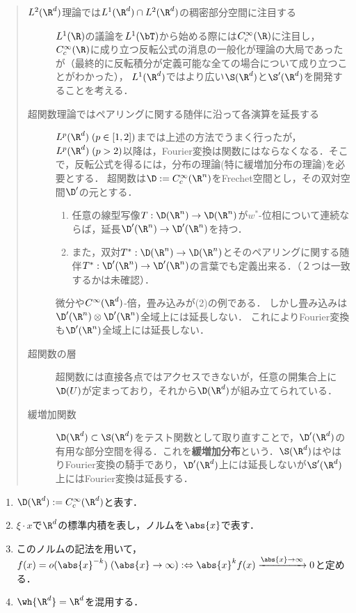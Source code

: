 \documentclass[uplatex,dvipdfmx]{jsreport}
\begin{document}
\begin{quotation}
    \begin{description}
        \item[$L^2(\R^d)$理論では$L^1(\R^d)\cap L^2(\R^d)$の稠密部分空間に注目する] $L^1(\R)$の議論を$L^1(\bT)$から始める際には$C_c^\infty(\R)$に注目し，
        $C_c^\infty(\R)$に成り立つ反転公式の消息の一般化が理論の大局であったが（最終的に反転積分が定義可能な全ての場合について成り立つことがわかった），
        $L^1(\R^d)$ではより広い$\S(\R^d)$と$\S'(\R^d)$を開発することを考える．
        \item[超関数理論ではペアリングに関する随伴に沿って各演算を延長する] 
        $L^p(\R^d)\;(p\in[1,2])$までは上述の方法でうまく行ったが，$L^p(\R^d)\;(p>2)$以降は，Fourier変換は関数にはならなくなる．そこで，反転公式を得るには，分布の理論(特に緩増加分布の理論)を必要とする．
        超関数は$\D:=C_c^\infty(\R^n)$をFrechet空間とし，その双対空間$\D'$の元とする．
        \begin{enumerate}
            \item 任意の線型写像$T:\D(\R^n)\to\D(\R^n)$が$w^*$-位相について連続ならば，延長$\D'(\R^n)\to\D'(\R^n)$を持つ．
            \item また，双対$T^*:\D(\R^n)\to\D(\R^n)$とそのペアリングに関する随伴$T^*:\D'(\R^n)\to\D'(\R^n)$の言葉でも定義出来る．（２つは一致するかは未確認）．
        \end{enumerate}
        微分や$C^\infty(\R^d)$-倍，畳み込みが(2)の例である．
        しかし畳み込みは$\D'(\R^n)\otimes\D'(\R^n)$全域上には延長しない．
        これによりFourier変換も$\D'(\R^n)$全域上には延長しない．
        \item[超関数の層] 超関数には直接各点ではアクセスできないが，任意の開集合上に$\D(U)$が定まっており，それから$\D(\R^d)$が組み立てられている．
        \item[緩増加関数] $\D(\R^d)\subset\S(\R^d)$をテスト関数として取り直すことで，$\D'(\R^d)$の有用な部分空間を得る．これを\textbf{緩増加分布}という．$\S(\R^d)$はやはりFourier変換の騎手であり，$\D'(\R^d)$上には延長しないが$\S'(\R^d)$上にはFourier変換は延長する．
    \end{description}
\end{quotation}

\begin{notation}\mbox{}
    \begin{enumerate}
        \item $\D(\R^d):=C_c^\infty(\R^d)$と表す．
        \item $\xi\cdot x$で$\R^d$の標準内積を表し，ノルムを$\abs{x}$で表す．
        \item このノルムの記法を用いて，$f(x)=o(\abs{x}^{-k})\;(\abs{x}\to\infty):\Leftrightarrow\abs{x}^kf(x)\xrightarrow{\abs{x}\to\infty}0$と定める．
        \item $\wh{\R^d}=\R^d$を混用する．
    \end{enumerate}
\end{notation}
\end{document}
